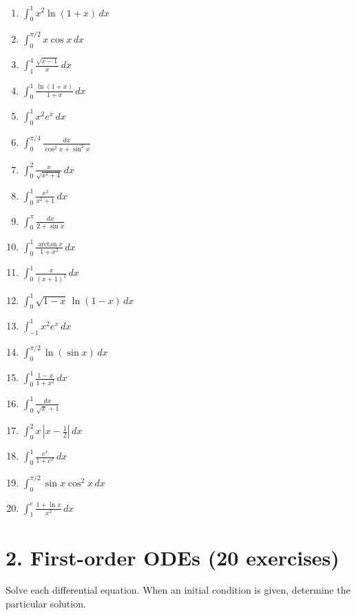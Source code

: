 \documentclass[11pt,a4paper]{article}
\newcommand{\workspace}{\vspace{2.2cm}}
\newcommand{\smallworkspace}{\vspace{1.6cm}}
\begin{document}
\begin{enumerate}
    \item $\displaystyle \int_0^1 x^2\ln(1+x)\,dx$\workspace
    \item $\displaystyle \int_0^{\pi/2} x\cos x\,dx$\workspace
    \item $\displaystyle \int_1^4 \frac{\sqrt{x-1}}{x}\,dx$\workspace
    \item $\displaystyle \int_0^1 \frac{\ln(1+x)}{1+x}\,dx$\workspace
    \item $\displaystyle \int_0^1 x^2 e^x\,dx$\workspace
    \item $\displaystyle \int_0^{\pi/4} \frac{dx}{\cos^2 x+\sin^2 x}$\smallworkspace
    \item $\displaystyle \int_0^2 \frac{x}{\sqrt{x^2+4}}\,dx$\workspace
    \item $\displaystyle \int_0^1 \frac{x^3}{x^2+1}\,dx$\workspace
    \item $\displaystyle \int_0^{\pi} \frac{dx}{2+\sin x}$\workspace
    \item $\displaystyle \int_0^1 \frac{\arctan x}{1+x^2}\,dx$\workspace
    \item $\displaystyle \int_0^1 \frac{x}{(x+1)^2}\,dx$\workspace
    \item $\displaystyle \int_0^1 \sqrt{1-x}\,\ln(1-x)\,dx$\workspace
    \item $\displaystyle \int_{-1}^1 x^2 e^x\,dx$\workspace
    \item $\displaystyle \int_0^{\pi/2} \ln(\sin x)\,dx$\workspace
    \item $\displaystyle \int_0^1 \frac{1-x}{1+x^2}\,dx$\workspace
    \item $\displaystyle \int_0^1 \frac{dx}{\sqrt{x}+1}$\workspace
    \item $\displaystyle \int_0^2 x\,|x-\tfrac12|\,dx$\workspace
    \item $\displaystyle \int_0^1 \frac{e^x}{1+e^x}\,dx$\workspace
    \item $\displaystyle \int_0^{\pi/2} \sin x\cos^2 x\,dx$\workspace
    \item $\displaystyle \int_1^e \frac{1+\ln x}{x^2}\,dx$\workspace
\end{enumerate}

\section*{2. First-order ODEs (20 exercises)}
Solve each differential equation. When an initial condition is given, determine the particular solution.
\end{document}
